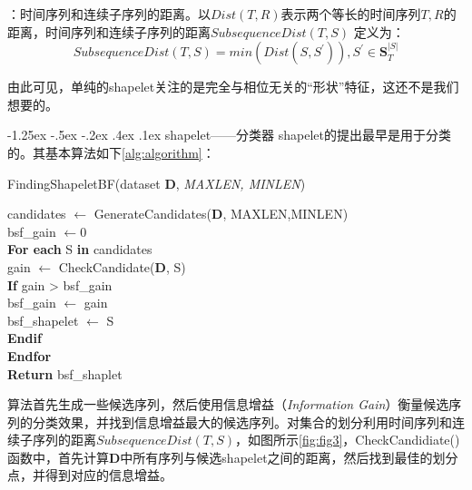 ﻿\documentclass[a4paper, 11pt]{article}
\makeatletter
\newcommand{\xiaosihao}{\fontsize{12pt}{\baselineskip}\selectfont}
\renewcommand\subsection{\@startsection{subsection}{1}{\z@}%
{-1.25ex \@plus -.5ex \@minus -.2ex}%
{.4ex \@plus .1ex}%
{\normalfont\xiaosihao\CJKfamily{hei}}}
\makeatother
\begin{document}
\begin{CJK}{UTF8}{gbsn}
 ：时间序列和连续子序列的距离。以$Dist(T, R)$表示两个等长的时间序列$T, R$的距离，时间序列和连续子序列的距离$SubsequenceDist(T, S)$ 定义为：
\[SubsequenceDist(T, S) = min(Dist(S, S^{'})), S^{'} \in \mathbf{S}_{T}^{|S|}\]\par

由此可见，单纯的shapelet关注的是完全与相位无关的“形状”特征，这还不是我们想要的。\par

\subsection{shapelet——分类器}
shapelet的提出最早是用于分类的。其基本算法如下\ref{alg:algorithm}：\par

\begin{algorithm}[htbp]
    \centering
    \caption{FindingShapeletBF(dataset \textbf{D}, \textit{MAXLEN, MINLEN})}
        \label{alg:algorithm}
    \begin{algorithmic}[1]
        \STATE candidates $\leftarrow$ GenerateCandidates(\textbf{D}, MAXLEN,MINLEN)\\
        \STATE bsf\_gain $\leftarrow 0$ \\
        \STATE \textbf{For each} S \textbf{in} candidates\\
        \STATE \qquad gain $\leftarrow$ CheckCandidate(\textbf{D}, S)\\
        \STATE \qquad \textbf{If} gain > bsf\_gain\\
        \STATE \qquad \qquad bsf\_gain $\leftarrow$ gain\\
        \STATE \qquad \qquad bsf\_shapelet $\leftarrow$ S\\
        \STATE \qquad \textbf{Endif}\\
        \STATE \textbf{Endfor}\\
        \STATE \textbf{Return} bsf\_shaplet\\
    \end{algorithmic}
\end{algorithm}

算法首先生成一些候选序列，然后使用信息增益（\textit{Information Gain}）衡量候选序列的分类效果，并找到信息增益最大的候选序列。对集合的划分利用时间序列和连续子序列的距离$SubsequenceDist(T, S)$，如图所示\ref{fig:fig3}，CheckCandidiate()函数中，首先计算\textbf{D}中所有序列与候选shapelet之间的距离，然后找到最佳的划分点，并得到对应的信息增益。\par


\end{CJK}
\end{document}

